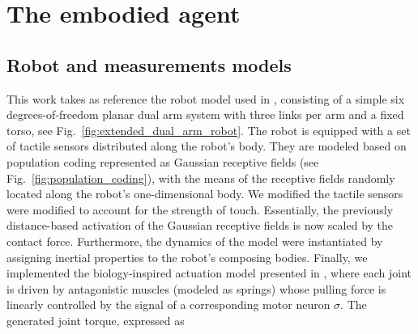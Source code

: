 \section{The embodied agent}


\subsection{Robot and measurements models}
This work takes as reference the robot model used in \cite{Mannella2018Knowyourbody,Marcel2022Learningreachown}, consisting of a simple six degrees-of-freedom planar dual arm system with three links per arm and a fixed torso, see Fig.~\ref{fig:extended_dual_arm_robot}. The robot is equipped with a set of tactile sensors distributed along the robot's body. They are modeled based on population coding \cite{Panzeri2010PopulationCoding} represented as Gaussian receptive fields (see Fig.~\ref{fig:population_coding}), with the means of the receptive fields randomly located along the robot's one-dimensional body. We modified the tactile sensors were modified to account for the strength of touch. Essentially, the previously distance-based activation of the Gaussian receptive fields is now scaled by the contact force. Furthermore, the dynamics of the model were instantiated by assigning inertial properties to the robot's composing bodies. Finally, we implemented the biology-inspired actuation model presented in \cite{Ekeberg1993combinedneuronalmechanical,Wadden1998neuromechanicalmodel, Shim2012Chaoticexplorationlearning}, where each joint is driven by antagonistic muscles (modeled as springs) whose pulling force is linearly controlled by the signal of a corresponding motor neuron $\sigma$. The generated joint torque, expressed as
